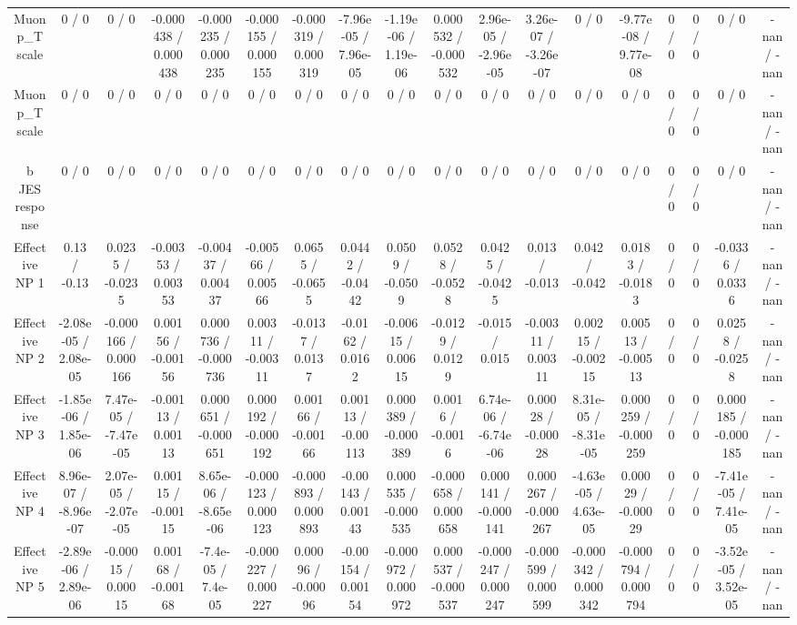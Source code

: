 \documentclass[10pt]{article}
\begin{document}
\begin{table}[htbp]
\begin{center}
\begin{tabular}{|c|c|c|c|c|c|c|c|c|c|c|c|c|c|c|c|c|c|}
  Muon p_{T} scale & 0 / 0 & 0 / 0 & -0.000438 / 0.000438 & -0.000235 / 0.000235 & -0.000155 / 0.000155 & -0.000319 / 0.000319 & -7.96e-05 / 7.96e-05 & -1.19e-06 / 1.19e-06 & 0.000532 / -0.000532 & 2.96e-05 / -2.96e-05 & 3.26e-07 / -3.26e-07 & 0 / 0 & -9.77e-08 / 9.77e-08 & 0 / 0 & 0 / 0 & 0 / 0 & -nan / -nan \\ 
  Muon p_{T} scale & 0 / 0 & 0 / 0 & 0 / 0 & 0 / 0 & 0 / 0 & 0 / 0 & 0 / 0 & 0 / 0 & 0 / 0 & 0 / 0 & 0 / 0 & 0 / 0 & 0 / 0 & 0 / 0 & 0 / 0 & 0 / 0 & -nan / -nan \\ 
  b JES response & 0 / 0 & 0 / 0 & 0 / 0 & 0 / 0 & 0 / 0 & 0 / 0 & 0 / 0 & 0 / 0 & 0 / 0 & 0 / 0 & 0 / 0 & 0 / 0 & 0 / 0 & 0 / 0 & 0 / 0 & 0 / 0 & -nan / -nan \\ 
  Effective NP 1 & 0.13 / -0.13 & 0.0235 / -0.0235 & -0.00353 / 0.00353 & -0.00437 / 0.00437 & -0.00566 / 0.00566 & 0.0655 / -0.0655 & 0.0442 / -0.0442 & 0.0509 / -0.0509 & 0.0528 / -0.0528 & 0.0425 / -0.0425 & 0.013 / -0.013 & 0.042 / -0.042 & 0.0183 / -0.0183 & 0 / 0 & 0 / 0 & -0.0336 / 0.0336 & -nan / -nan \\ 
  Effective NP 2 & -2.08e-05 / 2.08e-05 & -0.000166 / 0.000166 & 0.00156 / -0.00156 & 0.000736 / -0.000736 & 0.00311 / -0.00311 & -0.0137 / 0.0137 & -0.0162 / 0.0162 & -0.00615 / 0.00615 & -0.0129 / 0.0129 & -0.015 / 0.015 & -0.00311 / 0.00311 & 0.00215 / -0.00215 & 0.00513 / -0.00513 & 0 / 0 & 0 / 0 & 0.0258 / -0.0258 & -nan / -nan \\ 
  Effective NP 3 & -1.85e-06 / 1.85e-06 & 7.47e-05 / -7.47e-05 & -0.00113 / 0.00113 & 0.000651 / -0.000651 & 0.000192 / -0.000192 & 0.00166 / -0.00166 & 0.00113 / -0.00113 & 0.000389 / -0.000389 & 0.0016 / -0.0016 & 6.74e-06 / -6.74e-06 & 0.00028 / -0.00028 & 8.31e-05 / -8.31e-05 & 0.000259 / -0.000259 & 0 / 0 & 0 / 0 & 0.000185 / -0.000185 & -nan / -nan \\ 
  Effective NP 4 & 8.96e-07 / -8.96e-07 & 2.07e-05 / -2.07e-05 & 0.00115 / -0.00115 & 8.65e-06 / -8.65e-06 & -0.000123 / 0.000123 & -0.000893 / 0.000893 & -0.00143 / 0.00143 & 0.000535 / -0.000535 & -0.000658 / 0.000658 & 0.000141 / -0.000141 & 0.000267 / -0.000267 & -4.63e-05 / 4.63e-05 & 0.00029 / -0.00029 & 0 / 0 & 0 / 0 & -7.41e-05 / 7.41e-05 & -nan / -nan \\ 
  Effective NP 5 & -2.89e-06 / 2.89e-06 & -0.00015 / 0.00015 & 0.00168 / -0.00168 & -7.4e-05 / 7.4e-05 & -0.000227 / 0.000227 & 0.00096 / -0.00096 & -0.00154 / 0.00154 & -0.000972 / 0.000972 & 0.000537 / -0.000537 & -0.000247 / 0.000247 & -0.000599 / 0.000599 & -0.000342 / 0.000342 & -0.000794 / 0.000794 & 0 / 0 & 0 / 0 & -3.52e-05 / 3.52e-05 & -nan / -nan \\ 

\end{tabular}
\end{center}
\end{table}
\end{document}
